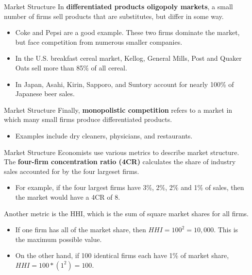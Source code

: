 \documentclass[11pt,t]{beamer}
\begin{document}
\begin{frame}{Market Structure}
   In \textbf{differentiated products oligopoly markets}, a small number of firms sell products that are substitutes, but differ in some way.

  \begin{itemize}
    \item Coke and Pepsi are a good example. These two firms dominate the market, but face competition from numerous smaller companies.
    
    \item In the U.S. breakfast cereal market, Kellog, General Mills, Post and Quaker Oats sell more than 85\% of all cereal.
    
    \item In Japan, Asahi, Kirin, Sapporo, and Suntory account for nearly 100\% of Japanese beer sales.
  \end{itemize}
\end{frame}

\begin{frame}{Market Structure}
   Finally, \textbf{monopolistic competition} refers to a market in which many small firms produce differentiated products.

  \begin{itemize}
    \item Examples include dry cleaners, physicians, and restaurants.
  \end{itemize}
\end{frame}

\begin{frame}{Market Structure}
  Economists use various metrics to describe market structure. The \textbf{four-firm concentration ratio (4CR)} calculates the share of industry sales accounted for by the four largeset firms.

  \begin{itemize}
    \item For example, if the four largest firms have 3\%, 2\%, 2\% and 1\% of sales, then the market would have a 4CR of 8.
  \end{itemize}

  \smallskip
  Another metric is the HHI, which is the sum of square market shares for all firms.

  \begin{itemize}
    \item If one firm has all of the market share, then $HHI = 100^2 = 10,000$. This is the maximum possible value.
    
    \item On the other hand, if 100 identical firms each have 1\% of market share, $HHI = 100 * (1^2) = 100$. 
  \end{itemize}
\end{frame}
\end{document}
